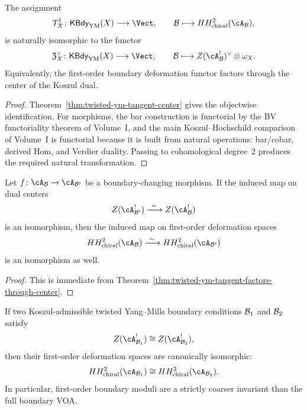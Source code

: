 \begin{theorem}
\label{thm:twisted-ym-tangent-factors-through-center}
The assignment
\[
T^1_X \colon \mathsf{KBdy}_{\mathrm{YM}}(X) \longrightarrow \Vect,
\qquad
\cB \longmapsto HH^2_{\mathrm{chiral}}(\cA_{\cB}),
\]
is naturally isomorphic to the functor
\[
\mathfrak{Z}^{\vee}_{X} \colon \mathsf{KBdy}_{\mathrm{YM}}(X) \longrightarrow \Vect,
\qquad
\cB \longmapsto Z(\cA_{\cB}^!)^{\vee} \otimes \omega_X.
\]
Equivalently, the first-order boundary deformation functor factors through the center of
the Koszul dual.
\end{theorem}

\begin{proof}
Theorem~\ref{thm:twisted-ym-tangent-center} gives the objectwise identification.
For morphisms, the bar construction is functorial by the BV functoriality theorem of Volume~I,
and the main Koszul--Hochschild comparison of Volume~I is functorial because it is built
from natural operations: bar/cobar, derived \(\mathrm{Hom}\), and Verdier duality. Passing to
cohomological degree~$2$ produces the required natural transformation.
\end{proof}

\begin{corollary}
\label{cor:twisted-ym-interface-invariance}
Let $f \colon \cA_{\cB} \to \cA_{\cB'}$ be a boundary-changing morphism.
If the induced map on dual centers
\[
Z(\cA_{\cB'}^!) \xrightarrow{\ \sim\ } Z(\cA_{\cB}^!)
\]
is an isomorphism, then the induced map on first-order deformation spaces
\[
HH^2_{\mathrm{chiral}}(\cA_{\cB}) \xrightarrow{\ \sim\ } HH^2_{\mathrm{chiral}}(\cA_{\cB'})
\]
is an isomorphism as well.
\end{corollary}

\begin{proof}
This is immediate from Theorem~\ref{thm:twisted-ym-tangent-factors-through-center}.
\end{proof}

\begin{corollary}
\label{cor:twisted-ym-center-comparison}
If two Koszul-admissible twisted Yang--Mills boundary conditions $\mathcal{B}_1$ and $\mathcal{B}_2$ satisfy
\[
Z(\cA_{\cB_1}^!) \cong Z(\cA_{\cB_2}^!),
\]
then their first-order deformation spaces are canonically isomorphic:
\[
HH^2_{\mathrm{chiral}}(\cA_{\cB_1}) \cong HH^2_{\mathrm{chiral}}(\cA_{\cB_2}).
\]
In particular, first-order boundary moduli are a strictly coarser invariant than the full
boundary VOA.
\end{corollary}

